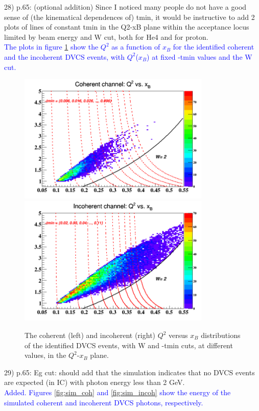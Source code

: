 28) p.65: (optional addition) Since I noticed many people do not have a good 
sense of (the kinematical dependences of) tmin, it would be instructive to add 
2 plots of lines of constant tmin in the Q2-xB plane within the acceptance 
locus limited by beam energy and W cut, both for He4 and for proton.\\
\textcolor{blue}{
   The plots in figure \ref{fig:Q2_xB} show the $Q^2$ as a function of $x_B$ 
for the identified coherent and the incoherent DVCS events, with $Q^2$($x_B$) 
at fixed -tmin values and the W cut.  }\\ 

\begin{figure}[tbp]
\includegraphics[height=6.2cm]{fig/coh_Q2_xB.png}
\includegraphics[height=6.2cm]{fig/incoh_Q2_xB.png}
\caption{The coherent (left) and incoherent (right) $Q^{2}$ versus $x_{B}$ 
distributions of the identified DVCS events, with W and -tmin cuts, at 
different values, in the $Q^{2}$-$x_{B}$ plane.}
\label{fig:Q2_xB}
 \end{figure}


29) p.65: Eg cut: should add that the simulation indicates that no DVCS events 
are expected (in IC) with photon energy less than 2 GeV. \\
\textcolor{blue}{ Added. Figures \ref{fig:sim_coh} and \ref{fig:sim_incoh} show 
the energy of the simulated coherent and incoherent DVCS photons, respectively.  
}\\

